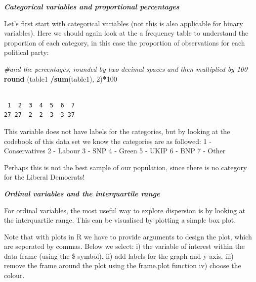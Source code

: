 \documentclass[]{article}
\newenvironment{Shaded}{\begin{snugshade}}{\end{snugshade}}
\newcommand{\CommentTok}[1]{\textcolor[rgb]{0.56,0.35,0.01}{\textit{#1}}}
\newcommand{\DecValTok}[1]{\textcolor[rgb]{0.00,0.00,0.81}{#1}}
\newcommand{\KeywordTok}[1]{\textcolor[rgb]{0.13,0.29,0.53}{\textbf{#1}}}
\newcommand{\NormalTok}[1]{#1}
\newcommand{\OperatorTok}[1]{\textcolor[rgb]{0.81,0.36,0.00}{\textbf{#1}}}
\newcommand{\StringTok}[1]{\textcolor[rgb]{0.31,0.60,0.02}{#1}}
\begin{document}
\textbf{\emph{Categorical variables and proportional percentages}}

Let's first start with categorical variables (not this is also applicable for binary variables). Here we should again look at the a frequency table to understand the proportion of each category, in this case the proportion of observations for each political party:

\begin{Shaded}
\end{Shaded}

\begin{Shaded}
\begin{Highlighting}[]
\CommentTok{#and the percentages, rounded by two decimal spaces and then multiplied by 100}
\KeywordTok{round}\NormalTok{ (table1 }\OperatorTok{/}\KeywordTok{sum}\NormalTok{(table1), }\DecValTok{2}\NormalTok{)}\OperatorTok{*}\DecValTok{100}
\end{Highlighting}
\end{Shaded}

\begin{verbatim}

 1  2  3  4  5  6  7 
27 27  2  2  3  3 37 
\end{verbatim}

This variable does not have labels for the categories, but by looking at the codebook of this data set we know the categories are as followed:
1 - Conservatives
2 - Labour
3 - SNP
4 - Green
5 - UKIP
6 - BNP
7 - Other

Perhaps this is not the best sample of our population, since there is no category for the Liberal Democrats!

\textbf{\emph{Ordinal variables and the interquartile range}}

For ordinal variables, the most useful way to explore dispersion is by looking at the interquartile range. This can be visualised by plotting a simple box plot.

Note that with plots in R we have to provide arguments to design the plot, which are seperated by commas. Below we select:
i) the variable of interest within the data frame (using the \$ symbol),
ii) add labels for the graph and y-axis,
iii) remove the frame around the plot using the frame.plot function
iv) choose the colour.
\end{document}
